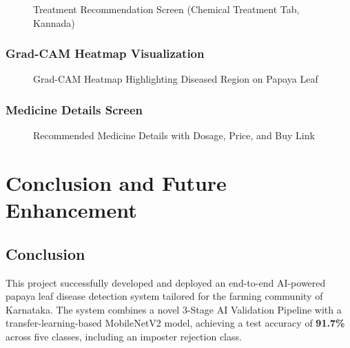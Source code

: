 \documentclass[12pt,a4paper]{report}
\begin{document}
\begin{figure}[h!]
\centering
\caption{Treatment Recommendation Screen (Chemical Treatment Tab, Kannada)}
\label{fig:treatment_screen}
\end{figure}

\subsection{Grad-CAM Heatmap Visualization}

\begin{figure}[h!]
\centering
\caption{Grad-CAM Heatmap Highlighting Diseased Region on Papaya Leaf}
\label{fig:gradcam}
\end{figure}

\subsection{Medicine Details Screen}

\begin{figure}[h!]
\centering
\caption{Recommended Medicine Details with Dosage, Price, and Buy Link}
\label{fig:medicine_screen}
\end{figure}

\chapter{Conclusion and Future Enhancement}

\section{Conclusion}
This project successfully developed and deployed an end-to-end AI-powered papaya leaf disease detection system tailored for the farming community of Karnataka. The system combines a novel 3-Stage AI Validation Pipeline with a transfer-learning-based MobileNetV2 model, achieving a test accuracy of \textbf{91.7\%} across five classes, including an imposter rejection class.
\end{document}

